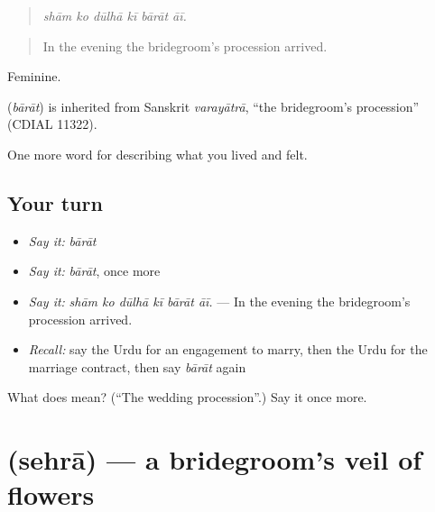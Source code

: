 \begin{quote}
     
\end{quote}

\begin{quote}
\emph{shām ko dūlhā kī bārāt āī.}
\end{quote}

\begin{quote}
In the evening the bridegroom's procession arrived.
\end{quote}

Feminine.

\begin{cousinweb}
\textbf{} (\emph{bārāt}) is inherited from Sanskrit \emph{varayātrā}, \textquotedblleft{}the bridegroom's procession\textquotedblright{} (CDIAL 11322).
\end{cousinweb}

\begin{grammarlens}[title={What you've built}]
One more word for describing what you lived and felt.
\end{grammarlens}

\subsection*{Your turn}
\begin{itemize}
\raggedright
  \item \emph{Say it:} \emph{bārāt}
  \item \emph{Say it:} \emph{bārāt}, once more
  \item \emph{Say it:} \emph{shām ko dūlhā kī bārāt āī.} — In the evening the bridegroom's procession arrived.
  \item \emph{Recall:} say the Urdu for an engagement to marry, then the Urdu for the marriage contract, then say \emph{bārāt} again
\end{itemize}

\begin{tcolorbox}[breakable,colback=teal!4,colframe=teal!35!black,title={Before you move on}]
What does  mean? (\textquotedblleft{}The wedding procession\textquotedblright{}.) Say it once more.
\end{tcolorbox}
\section[\texorpdfstring{\ur{سہرا} (sehrā)}{سہرا (sehrā)}]{ (sehrā) — a bridegroom's veil of flowers}

